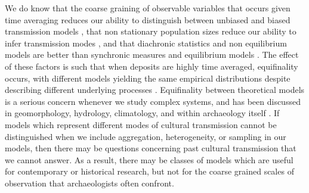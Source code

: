 We do know that the coarse graining of observable variables that occurs given time averaging reduces our ability to distinguish between
unbiased and biased transmission models
\cite{Madsen2012TA, Porcic2014Exploring-the-E, Premo:2014jv}, that non stationary
population sizes reduce our ability to infer transmission modes \cite{Rorabaugh:2014fl}, and that
diachronic statistics and non equilibrium models are better than
synchronic measures and equilibrium models 
\cite{kandler2013non, wilderkandler2015}.  The effect of these factors is such that when deposits are highly time averaged, equifinality occurs, with different models yielding the same empirical distributions despite describing different underlying processes \cite{von1949problems}. Equifinality between
theoretical models is a serious concern whenever we study complex
systems, and has been discussed in geomorphology, hydrology,
climatology, and within archaeology itself
\cite{Aronica:1998dm, Beven:2006js, Bonham:2009bi, Cicchetti:1996gp, 
Culling:1987kx, Marean:1992hg, Rogers:2000bq, Savenije:2001fe}.
If models which represent different modes of cultural transmission
cannot be distinguished when we include aggregation, heterogeneity, or sampling in our models,
then there may be questions concerning past cultural transmission that
we cannot answer.  As a result, there may be classes of models which are useful for contemporary or historical 
research, but not for the coarse grained scales of observation that archaeologists often confront.

